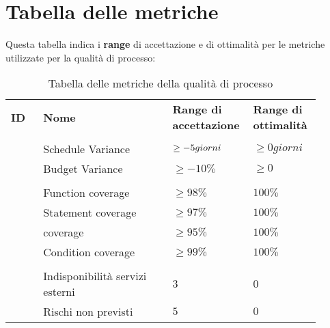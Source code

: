 \documentclass[PianoDiQualifica.tex]{subfiles}
\begin{document}
\section{Tabella delle metriche}
Questa tabella indica i \textbf{range} di accettazione e di ottimalità per le metriche utilizzate per la qualità di processo:
\begin{table}[H]
	\begin{center}
		\begin{tabu} to 
			\tableHeaderStyle
			
			\textbf{ID} & \textbf{Nome} & \textbf{Range di accettazione} & \textbf{Range di ottimalità}\\
			
			\\
			 & Schedule Variance & $ \geq -5 \space giorni $ & $ \geq 0 giorni $ \\
			 & Budget Variance & $ \geq -10\% $ & $ \geq 0 $ \\
			
			\hline
			\\
			 & Function coverage & $ \geq 98\% $ & $ 100\% $\\
			 & Statement coverage &  $ \geq 97\% $& $ 100\% $\\
			 &  coverage & $ \geq 95\% $ & $ 100\% $\\
			 & Condition coverage & $ \geq 99\% $ & $ 100\% $\\

			\hline
			\\
			 & Indisponibilità servizi esterni & $ 3 $ & $ 0 $\\
			 & Rischi non previsti & $ 5 $ & $ 0 $\\ 


			
		\end{tabu}
		\caption{Tabella delle metriche della qualità di processo}
		\vspace{-1em}
	\end{center}
\end{table}
\end{document}
